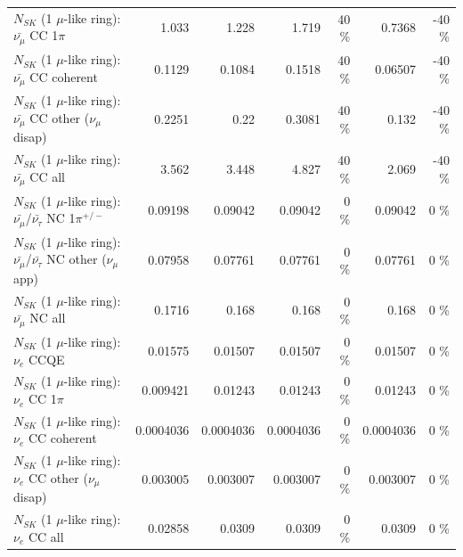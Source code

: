 \begin{table}
\begin{tabular}{| l | r | r | r  r | r  r |}
                         $N_{SK}$ (1 $\mu$-like ring): $\bar{\nu_\mu}$ CC 1$\pi$ &           1.033 &           1.228 &           1.719 &       40 \%  &          0.7368 &      -40 \%  \\ 
                       $N_{SK}$ (1 $\mu$-like ring): $\bar{\nu_\mu}$ CC coherent &          0.1129 &          0.1084 &          0.1518 &       40 \%  &         0.06507 &      -40 \%  \\ 
        $N_{SK}$ (1 $\mu$-like ring): $\bar{\nu_\mu}$ CC other ($\nu_\mu$ disap) &          0.2251 &            0.22 &          0.3081 &       40 \%  &           0.132 &      -40 \%  \\ 
                          $N_{SK}$ (1 $\mu$-like ring): $\bar{\nu_{\mu}}$ CC all &           3.562 &           3.448 &           4.827 &       40 \%  &           2.069 &      -40 \%  \\ 
\hline
  $N_{SK}$ (1 $\mu$-like ring): $\bar{\nu_\mu}$/$\bar{\nu_\tau}$ NC 1$\pi^{+/-}$ &         0.09198 &         0.09042 &         0.09042 &        0 \%  &         0.09042 &        0 \%  \\ 
$N_{SK}$ (1 $\mu$-like ring): $\bar{\nu_\mu}$/$\bar{\nu_\tau}$ NC other ($\nu_\mu$ app) &         0.07958 &         0.07761 &         0.07761 &        0 \%  &         0.07761 &        0 \%  \\ 
                          $N_{SK}$ (1 $\mu$-like ring): $\bar{\nu_{\mu}}$ NC all &          0.1716 &           0.168 &           0.168 &        0 \%  &           0.168 &        0 \%  \\ 
\hline
\hline
\hline
                                      $N_{SK}$ (1 $\mu$-like ring): $\nu_e$ CCQE &         0.01575 &         0.01507 &         0.01507 &        0 \%  &         0.01507 &        0 \%  \\ 
                                 $N_{SK}$ (1 $\mu$-like ring): $\nu_e$ CC 1$\pi$ &        0.009421 &         0.01243 &         0.01243 &        0 \%  &         0.01243 &        0 \%  \\ 
                               $N_{SK}$ (1 $\mu$-like ring): $\nu_e$ CC coherent &       0.0004036 &       0.0004036 &       0.0004036 &        0 \%  &       0.0004036 &        0 \%  \\ 
                $N_{SK}$ (1 $\mu$-like ring): $\nu_e$ CC other ($\nu_\mu$ disap) &        0.003005 &        0.003007 &        0.003007 &        0 \%  &        0.003007 &        0 \%  \\ 
                                  $N_{SK}$ (1 $\mu$-like ring): $\nu_{e}$ CC all &         0.02858 &          0.0309 &          0.0309 &        0 \%  &          0.0309 &        0 \%  \\ 

\end{tabular}
\end{table}
